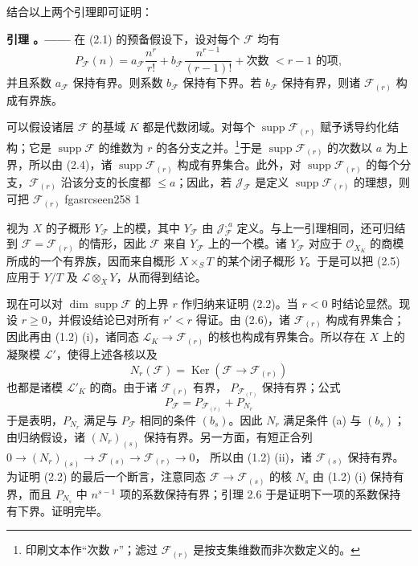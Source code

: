 \documentclass[12pt,twoside,openany]{book}
\numberwithin{equation}{section}
\newcommand{\fgaunitid}{unbound}
\newcommand{\src}[1]{%
  \phantomsection
  \hypertarget{src:\fgaunitid:#1}{}%
  \hypertarget{fga.\fgaunitid.p#1}{}%
  \ifcsname fgasrcseen#1\endcsname\else
    \expandafter\gdef\csname fgasrcseen#1\endcsname{1}%
    \hypertarget{src:#1}{}%
  \fi
  \marginpar{\raggedleft\footnotesize\sffamily #1}%
}
\theoremstyle{plain}
\theoremstyle{definition}
\theoremstyle{remark}
\newcommand{\result}[2]{%
  \par\medskip\noindent\textbf{#1%
  \if\relax\detokenize{#2}\relax\else\space#2\fi。——}\enspace
}
\begin{document}
结合以上两个引理即可证明：

\result{引理}{2.6} 在 (2.1) 的预备假设下，设对每个 $\mathcal F$ 均有
\[
P_{\mathcal F}(n)=a_{\mathcal F}\frac{n^r}{r!}
+b_{\mathcal F}\frac{n^{r-1}}{(r-1)!}
+\text{次数 $<r-1$ 的项},
\]
并且系数 $a_{\mathcal F}$ 保持有界。则系数 $b_{\mathcal F}$ 保持有下界。若 $b_{\mathcal F}$ 保持有界，则诸 $\mathcal F_{(r)}$ 构成有界族。

可以假设诸层 $\mathcal F$ 的基域 $K$ 都是代数闭域。对每个
$\operatorname{supp}\mathcal F_{(r)}$ 赋予诱导约化结构；它是
$\operatorname{supp}\mathcal F$ 的维数为 $r$ 的各分支之并。\footnote{印刷文本作“次数 $r$”；滤过 $\mathcal F_{(r)}$ 是按支集维数而非次数定义的。}于是
$\operatorname{supp}\mathcal F_{(r)}$ 的次数以 $a$ 为上界，所以由
(2.4)，诸 $\operatorname{supp}\mathcal F_{(r)}$ 构成有界集合。此外，对
$\operatorname{supp}\mathcal F_{(r)}$ 的每个分支，$\mathcal F_{(r)}$ 沿该分支的长度都 $\leq a$；因此，若 $\mathcal J_{\mathcal F}$ 是定义
$\operatorname{supp}\mathcal F_{(r)}$ 的理想，则可把
$\mathcal F_{(r)}$
\src{258}
视为 $X$ 的子概形 $Y_{\mathcal F}$ 上的模，其中
$Y_{\mathcal F}$ 由 $\mathcal J_{\mathcal F}^{,a}$ 定义。与上一引理相同，还可归结到 $\mathcal F=\mathcal F_{(r)}$ 的情形，因此
$\mathcal F$ 来自 $Y_{\mathcal F}$ 上的一个模。诸 $Y_{\mathcal F}$ 对应于
$\mathcal O_{X_K}$ 的商模所成的一个有界族，因而来自概形
$X\times_S T$ 的某个闭子概形 $Y$。于是可以把 (2.5) 应用于
$Y/T$ 及 $\mathcal L\otimes_XY$，从而得到结论。

现在可以对 $\dim\operatorname{supp}\mathcal F$ 的上界 $r$ 作归纳来证明
(2.2)。当 $r<0$ 时结论显然。现设 $r\geq0$，并假设结论已对所有
$r'<r$ 得证。由 (2.6)，诸 $\mathcal F_{(r)}$ 构成有界集合；因此再由
(1.2) (i)，诸同态
$\mathcal L_K\longrightarrow\mathcal F_{(r)}$ 的核也构成有界集合。所以存在 $X$ 上的凝聚模 $\mathcal L'$，使得上述各核以及
\[
N_r(\mathcal F)=\operatorname{Ker}(\mathcal F\longrightarrow\mathcal F_{(r)})
\]
也都是诸模 $\mathcal L'_K$ 的商。由于诸 $\mathcal F_{(r)}$ 有界，
$P_{\mathcal F_{(r)}}$ 保持有界；公式
\[
P_{\mathcal F}=P_{\mathcal F_{(r)}}+P_{N_r}
\]
于是表明，$P_{N_r}$ 满足与 $P_{\mathcal F}$ 相同的条件 $(b_s)$。因此
$N_r$ 满足条件 (a) 与 $(b_s)$；由归纳假设，诸
$(N_r)_{(s)}$ 保持有界。另一方面，有短正合列
$0\longrightarrow(N_r)_{(s)}\longrightarrow\mathcal F_{(s)}
\longrightarrow\mathcal F_{(r)}\longrightarrow0$，
所以由 (1.2) (ii)，诸 $\mathcal F_{(s)}$ 保持有界。为证明 (2.2)
的最后一个断言，注意同态
$\mathcal F\longrightarrow\mathcal F_{(s)}$ 的核 $N_s$ 由 (1.2) (i) 保持有界，而且 $P_{N_s}$ 中 $n^{s-1}$ 项的系数保持有界；引理 2.6 于是证明下一项的系数保持有下界。证明完毕。
\end{document}

